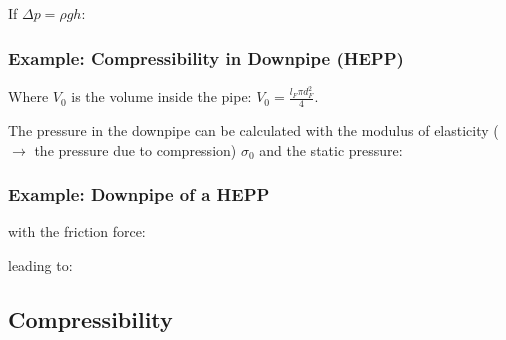 \documentclass[10pt,a4paper]{scrartcl}
\begin{document}
\begin{multicols*}{3}

If $\Delta p=\rho g h$:


\subsubsection{Example: Compressibility in Downpipe (HEPP)}


Where $V_0$ is the volume inside the pipe: $V_0=\frac{l_F \pi d_F^2}{4}$.

The pressure in the downpipe can be calculated with the modulus of elasticity ($\rightarrow$ the pressure due to compression) $\sigma_0$ and the static pressure:


\subsubsection{Example: Downpipe of a HEPP}



with the friction force:


leading to:


\subsection{Compressibility}



\end{multicols*}
\end{document}

